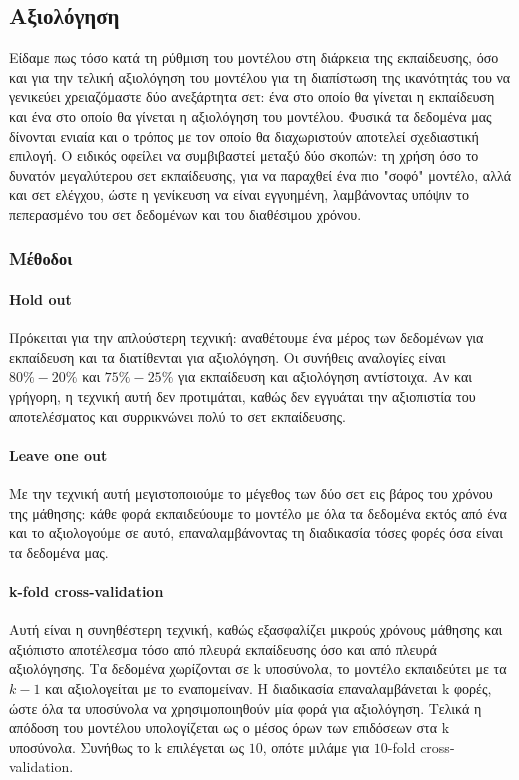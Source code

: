 \subsection{Αξιολόγηση}
Είδαμε πως τόσο κατά τη ρύθμιση του μοντέλου στη διάρκεια της εκπαίδευσης, όσο και για την τελική αξιολόγηση του μοντέλου για τη διαπίστωση της ικανότητάς του να γενικεύει χρειαζόμαστε δύο ανεξάρτητα σετ: ένα στο οποίο θα γίνεται η εκπαίδευση και ένα στο οποίο θα γίνεται η αξιολόγηση του μοντέλου. Φυσικά τα δεδομένα μας δίνονται ενιαία και ο τρόπος με τον οποίο θα διαχωριστούν αποτελεί σχεδιαστική επιλογή. O ειδικός οφείλει να συμβιβαστεί μεταξύ δύο σκοπών: τη
χρήση όσο το δυνατόν μεγαλύτερου σετ εκπαίδευσης, για να παραχθεί ένα πιο "σοφό" μοντέλο, αλλά και σετ ελέγχου, ώστε η γενίκευση να είναι εγγυημένη, λαμβάνοντας υπόψιν το πεπερασμένο του σετ δεδομένων και του διαθέσιμου χρόνου.
\subsubsection{Μέθοδοι} \label{section:eval}
\paragraph{Hold out} Πρόκειται για την απλούστερη τεχνική: αναθέτουμε ένα μέρος των δεδομένων για εκπαίδευση και τα διατίθενται για αξιολόγηση. Οι συνήθεις αναλογίες είναι $80\%-20\%$ και $75\%-25\%$ για εκπαίδευση και αξιολόγηση αντίστοιχα. Αν και γρήγορη, η τεχνική αυτή δεν προτιμάται, καθώς δεν εγγυάται την αξιοπιστία του αποτελέσματος και συρρικνώνει πολύ το σετ εκπαίδευσης.
\paragraph{Leave one out} Με την τεχνική αυτή μεγιστοποιούμε το μέγεθος των δύο σετ εις βάρος του χρόνου της μάθησης: κάθε φορά εκπαιδεύουμε το μοντέλο με όλα τα δεδομένα εκτός από ένα και το αξιολογούμε σε αυτό, επαναλαμβάνοντας τη διαδικασία τόσες φορές όσα είναι τα δεδομένα μας.
\paragraph{k-fold cross-validation}Αυτή είναι η συνηθέστερη τεχνική, καθώς εξασφαλίζει μικρούς χρόνους μάθησης και αξιόπιστο αποτέλεσμα τόσο από πλευρά εκπαίδευσης όσο και από πλευρά αξιολόγησης. Τα δεδομένα χωρίζονται σε k υποσύνολα, το μοντέλο εκπαιδεύτει με τα $k-1$ και αξιολογείται με το εναπομείναν. Η διαδικασία επαναλαμβάνεται k φορές, ώστε όλα τα υποσύνολα να χρησιμοποιηθούν μία φορά για
αξιολόγηση. Τελικά η απόδοση του μοντέλου υπολογίζεται ως ο μέσος όρων των επιδόσεων στα k υποσύνολα. Συνήθως το k επιλέγεται ως $10$, οπότε μιλάμε για $10$-fold cross-validation. 
